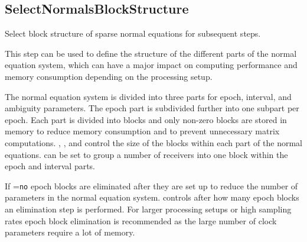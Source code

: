 \subsection{SelectNormalsBlockStructure}\label{gnssProcessingStepType:selectNormalsBlockStructure}
Select block structure of sparse normal equations for subsequent steps.

This step can be used to define the structure of the different parts of the normal equation system,
which can have a major impact on computing performance and memory consumption depending on the processing setup.


The normal equation system is divided into three parts for epoch, interval, and ambiguity parameters.
The epoch part is subdivided further into one subpart per epoch. Each part is divided into blocks and only non-zero
blocks are stored in memory to reduce memory consumption and to prevent unnecessary matrix computations.
, , and  control
the size of the blocks within each part of the normal equations.  can be set to group
a number of receivers into one block within the epoch and interval parts.

If =\verb|no| epoch blocks are eliminated after they are set up to reduce the number
of parameters in the normal equation system.  controls after how many epoch blocks
an elimination step is performed. For larger processing setups or high sampling rates epoch block elimination is recommended
as the large number of clock parameters require a lot of memory.


